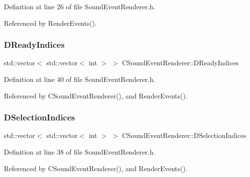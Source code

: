 Definition at line 26 of file Sound\+Event\+Renderer.\+h.



Referenced by Render\+Events().

\hypertarget{classCSoundEventRenderer_a68d2be3282880d4d7b47ee94b0a30139}{}\label{classCSoundEventRenderer_a68d2be3282880d4d7b47ee94b0a30139} 
\subsubsection{\texorpdfstring{D\+Ready\+Indices}{DReadyIndices}}
{\footnotesize\ttfamily std\+::vector$<$ std\+::vector$<$ int $>$ $>$ C\+Sound\+Event\+Renderer\+::\+D\+Ready\+Indices\hspace{0.3cm}{\ttfamily [protected]}}



Definition at line 40 of file Sound\+Event\+Renderer.\+h.



Referenced by C\+Sound\+Event\+Renderer(), and Render\+Events().

\hypertarget{classCSoundEventRenderer_afda3dfc8fa16264d91bc56a4bb1d150c}{}\label{classCSoundEventRenderer_afda3dfc8fa16264d91bc56a4bb1d150c} 
\subsubsection{\texorpdfstring{D\+Selection\+Indices}{DSelectionIndices}}
{\footnotesize\ttfamily std\+::vector$<$ std\+::vector$<$ int $>$ $>$ C\+Sound\+Event\+Renderer\+::\+D\+Selection\+Indices\hspace{0.3cm}{\ttfamily [protected]}}



Definition at line 38 of file Sound\+Event\+Renderer.\+h.



Referenced by C\+Sound\+Event\+Renderer(), and Render\+Events().

\hypertarget{classCSoundEventRenderer_a5abf598a7e8783d9cc78e0d33a65c9c2}{}\label{classCSoundEventRenderer_a5abf598a7e8783d9cc78e0d33a65c9c2} 
